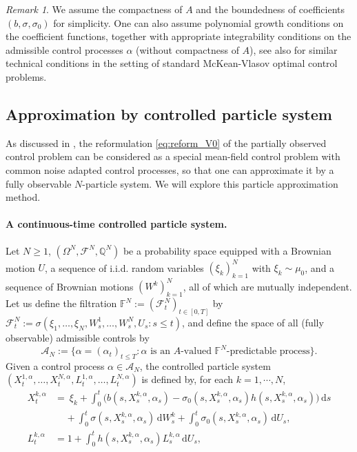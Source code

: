\documentclass[11pt]{article}
\numberwithin{equation}{section}
\theoremstyle{plain}
\theoremstyle{definition}
\theoremstyle{remark}
\newtheorem{remark}[theorem]{Remark}
\newcommand{\dd}{\mathrm{d}}
\newcommand{\Ac}{\mathcal{A}}
\begin{document}
	
	\begin{remark}
		We assume the compactness of $A$ and the boundedness of  coefficients $(b, \sigma, \sigma_0)$  for simplicity.
		One can also assume polynomial growth conditions on the coefficient functions, together with appropriate integrability conditions on the admissible control processes $\alpha$ (without compactness of $A$),
		see also \cite[Assumption 3.1]{bouchard2025limit} for similar technical conditions in the setting of standard McKean-Vlasov optimal control problems.
	\end{remark}
	
	
	\subsection{Approximation by controlled particle system} \label{subsec:particle-approx}
	
	As discussed in \cite[Section 5]{bouchard2025limit}, the reformulation \eqref{eq:reform_V0} of the partially observed control problem can be considered as a special mean-field control problem with common noise adapted control processes,
	so that one can approximate it by a fully observable $N$-particle system.
	We will explore this particle approximation method.
	
	
	\paragraph{A continuous-time controlled particle system.}
	
	Let $N \ge 1$, $(\Omega^N, \mathcal{F}^N, \mathbb{Q}^N)$ be a probability space equipped with a Brownian motion $U$, a sequence of i.i.d. random variables $(\xi_k)_{k=1}^N$ with $\xi_k \sim \mu_0$, and a sequence of Brownian motions $(W^k)_{k=1}^N$, all of which are mutually independent. 
	Let us define the filtration $\mathbb{F}^N:=(\mathcal{F}_t^N)_{t\in [0,T]}$ by $\mathcal{F}_t^N:=\sigma(\xi_1,\dots, \xi_N, W_s^1,\dots, W_s^N, U_s: s\le t)$,
	and define the space of all (fully observable) admissible controls by 
	\begin{equation*}
		\mathcal{A}_N := \{\alpha = (\alpha_t)_{t\le T}: \alpha \text{ is an }A\text{-valued } \mathbb{F}^{N}\text{-predictable process}\}.
	\end{equation*}
	Given a control process $\alpha \in \Ac_N$, the controlled particle system $(X_t^{1,\alpha}, \dots, X_t^{N,\alpha}, L_t^{1,\alpha}, \dots, L_t^{N,\alpha})$ is defined by,
	for each $k = 1, \cdots, N$,
	\begin{align} 
		X_t^{k,\alpha} &=~ \xi_k + \int_0^t \Big(b(s, X_s^{k,\alpha},  \alpha_s) - \sigma_0(s,X_s^{k,\alpha}, \alpha_s) h(s, X_s^{k,\alpha}, \alpha_s) \Big) \,\dd s \nonumber \\
		&~~~~~+ \int_0^t \sigma(s,X_s^{k,\alpha}, \alpha_s)\,\dd W_s^{k} + \int_0^t \sigma_0(s, X_s^{k, \alpha}, \alpha_s)\,\dd U_s, \label{eq:SDE_XN} \\
		L_t^{k,\alpha} &= 1 + \int_0^t  h(s, X_s^{k,\alpha}, \alpha_s) L_s^{k,\alpha} \,\dd U_s, \label{eq:SDE_LN}
	\end{align}
	
\end{document}
